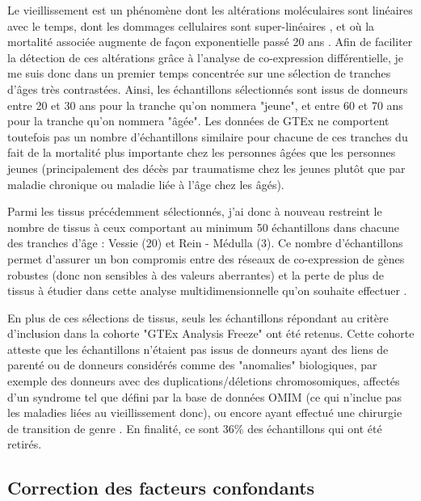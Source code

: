 
Le vieillissement est un phénomène dont les altérations moléculaires sont linéaires avec le temps, dont les dommages cellulaires sont super-linéaires \cite{Todhunter2018}, et où la mortalité associée augmente de façon exponentielle passé 20 ans \cite{Finch2016}. Afin de faciliter la détection de ces altérations grâce à l'analyse de co-expression différentielle, je me suis donc dans un premier temps concentrée sur une sélection de tranches d'âges très contrastées. Ainsi, les échantillons sélectionnés sont issus de donneurs entre 20 et 30 ans pour la tranche qu'on nommera "jeune", et entre 60 et 70 ans pour la tranche qu'on nommera "âgée". Les données de GTEx ne comportent toutefois pas un nombre d'échantillons similaire pour chacune de ces tranches du fait de la mortalité plus importante chez les personnes âgées que les personnes jeunes (principalement des décès par traumatisme chez les jeunes plutôt que par maladie chronique ou maladie liée à l'âge chez les âgés). 

Parmi les tissus précédemment sélectionnés, j'ai donc à nouveau restreint le nombre de tissus à ceux comportant au minimum 50 échantillons dans chacune des tranches d'âge : Vessie (20) et Rein - Médulla (3). Ce nombre d'échantillons permet d'assurer un bon compromis entre des réseaux de co-expression de gènes robustes (donc non sensibles à des valeurs aberrantes) et la perte de plus de tissus à étudier dans cette analyse multidimensionnelle qu'on souhaite effectuer \cite{Liesecke2019}.

En plus de ces sélections de tissus, seuls les échantillons répondant au critère d'inclusion dans la cohorte "GTEx Analysis Freeze" ont été retenus. Cette cohorte atteste que les échantillons n'étaient pas issus de donneurs ayant des liens de parenté ou de donneurs considérés comme des "anomalies"  biologiques, par exemple des donneurs avec des duplications/déletions chromosomiques, affectés d'un syndrome tel que défini par la base de données OMIM \cite{Hamosh2005} (ce qui n'inclue pas les maladies liées au vieillissement donc), ou encore ayant effectué une chirurgie de transition de genre . En finalité, ce sont 36\% des échantillons qui ont été retirés.


\subsection{Correction des facteurs confondants}


